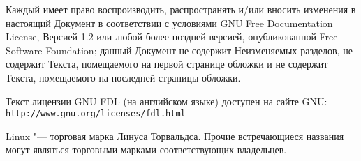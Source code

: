 \thispagestyle{empty}
Каждый имеет право воспроизводить, распространять и/или вносить изменения в
настоящий Документ в соответствии с условиями GNU Free Documentation License,
Версией 1.2 или любой более поздней версией, опубликованной Free Software
Foundation;
данный Документ не содержит Неизменяемых разделов, не содержит
Текста, помещаемого на первой странице обложки и не содержит Текста,
помещаемого на последней страницы обложки.

Текст лицензии GNU FDL (на английском языке) 
доступен на сайте GNU:\\
\nolinkurl{http://www.gnu.org/licenses/fdl.html}

\medskip

Linux "--- торговая марка Линуса Торвальдса. Прочие встречающиеся
названия могут являться торговыми марками соответствующих владельцев.

\clearpage

